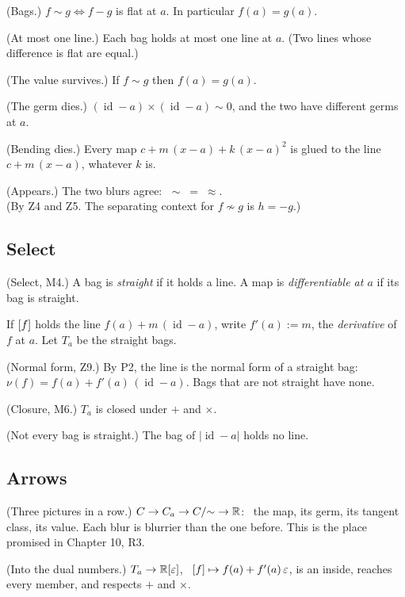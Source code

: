 \begin{lines}
\item[\lab{P1}] (Bags.) $f \sim g \iff f - g$ is flat at $a$. In particular $f(a) = g(a)$.
\item[\lab{P2}] (At most one line.) Each bag holds at most one line at $a$. (Two lines whose difference is flat are equal.)
\item[\lab{P3}] (The value survives.) If $f \sim g$ then $f(a) = g(a)$.
\item[\lab{P4.1}] (The germ dies.) $(\operatorname{id} - a) \times (\operatorname{id} - a) \sim 0$, and the two have different germs at $a$.
\item[\lab{P4.2}] (Bending dies.) Every map $c + m\,(x - a) + k\,(x - a)^2$ is glued to the line $c + m\,(x - a)$, whatever $k$ is.
\item[\lab{P5}] (Appears.) The two blurs agree: $\;\sim \;=\; \approx$. \\
(By Z4 and Z5. The separating context for $f \not\sim g$ is $h = -g$.)
\end{lines}

\subsection*{Select}

\begin{lines}
\item[\lab{D4}] (Select, M4.) A bag is \emph{straight} if it holds a line. A map is \emph{differentiable at $a$} if its bag is straight.
\item[\lab{N1}] If $[f]$ holds the line $f(a) + m\,(\operatorname{id} - a)$, write $f'(a) := m$, the \emph{derivative} of $f$ at $a$. Let $T_a$ be the straight bags.
\item[] (Normal form, Z9.) By P2, the line is the normal form of a straight bag: $\nu(f) = f(a) + f'(a)\,(\operatorname{id} - a)$. Bags that are not straight have none.
\item[\lab{P6}] (Closure, M6.) $T_a$ is closed under $+$ and $\times$.
\item[\lab{P7}] (Not every bag is straight.) The bag of $|\operatorname{id} - a|$ holds no line.
\end{lines}

\subsection*{Arrows}

\begin{lines}
\item[\lab{P8}] (Three pictures in a row.) $C \to C_a \to C/{\sim} \to \mathbb{R}$: \ the map, its germ, its tangent class, its value. Each blur is blurrier than the one before. This is the place promised in Chapter 10, R3.
\item[\lab{P9}] (Into the dual numbers.) $T_a \to \mathbb{R}[\varepsilon]$, \ $[f] \mapsto f(a) + f'(a)\,\varepsilon$, is an inside, reaches every member, and respects $+$ and $\times$.
\end{lines}

